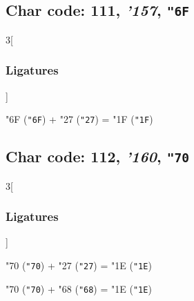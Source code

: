 \documentclass{article}
\newlength{\maxcharwidth}
\begin{document}
\subsection{Char code: 111, {\it'157}, {\tt"6F}}
\label{char_111}


\begin{multicols}{3}[\subsubsection{Ligatures}]

{\testfont\char"6F\noboundary} ({\tt"6F}) + {\testfont\char"27\noboundary} ({\tt"27}) = {\testfont\char"1F\noboundary} ({\tt"1F}) 

\end{multicols}

\subsection{Char code: 112, {\it'160}, {\tt"70}}
\label{char_112}


\begin{multicols}{3}[\subsubsection{Ligatures}]

{\testfont\char"70\noboundary} ({\tt"70}) + {\testfont\char"27\noboundary} ({\tt"27}) = {\testfont\char"1E\noboundary} ({\tt"1E}) 

{\testfont\char"70\noboundary} ({\tt"70}) + {\testfont\char"68\noboundary} ({\tt"68}) = {\testfont\char"1E\noboundary} ({\tt"1E}) 

\end{multicols}
\end{document}
